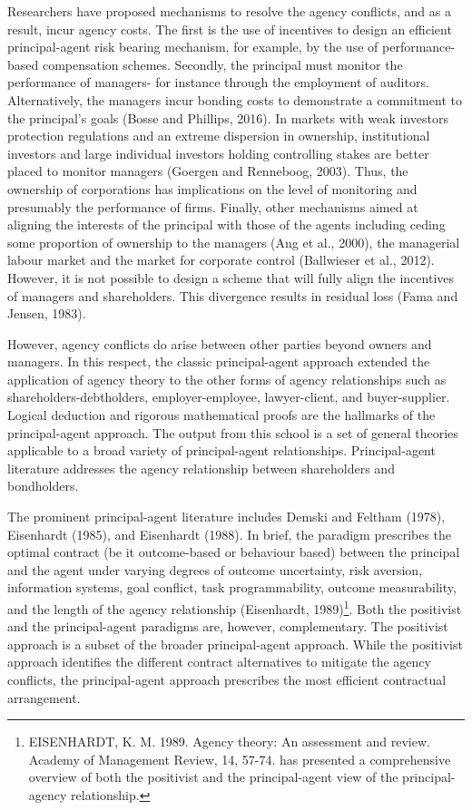 \documentclass[a4paper, nobind]{templates/ociamthesis}
\begin{document}
Researchers have proposed mechanisms to resolve the agency conflicts, and as a result, incur agency costs. The first is the use of incentives to design an efficient principal-agent risk bearing mechanism, for example, by the use of performance-based compensation schemes. Secondly, the principal must monitor the performance of managers- for instance through the employment of auditors. Alternatively, the managers incur bonding costs to demonstrate a commitment to the principal's goals (Bosse and Phillips, 2016).
In markets with weak investors protection regulations and an extreme dispersion in ownership, institutional investors and large individual investors holding controlling stakes are better placed to monitor managers (Goergen and Renneboog, 2003). Thus, the ownership of corporations has implications on the level of monitoring and presumably the performance of firms. Finally, other mechanisms aimed at aligning the interests of the principal with those of the agents including ceding some proportion of ownership to the managers (Ang et al., 2000), the managerial labour market and the market for corporate control (Ballwieser et al., 2012). However, it is not possible to design a scheme that will fully align the incentives of managers and shareholders. This divergence results in residual loss (Fama and Jensen, 1983).

However, agency conflicts do arise between other parties beyond owners and managers. In this respect, the classic principal-agent approach extended the application of agency theory to the other forms of agency relationships such as shareholders-debtholders, employer-employee, lawyer-client, and buyer-supplier. Logical deduction and rigorous mathematical proofs are the hallmarks of the principal-agent approach. The output from this school is a set of general theories applicable to a broad variety of principal-agent relationships. Principal-agent literature addresses the agency relationship between shareholders and bondholders.

The prominent principal-agent literature includes Demski and Feltham (1978), Eisenhardt (1985), and Eisenhardt (1988). In brief, the paradigm prescribes the optimal contract (be it outcome-based or behaviour based) between the principal and the agent under varying degrees of outcome uncertainty, risk aversion, information systems, goal conflict, task programmability, outcome measurability, and the length of the agency relationship (Eisenhardt, 1989)\footnote{EISENHARDT, K. M. 1989. Agency theory: An assessment and review. Academy of Management Review, 14, 57-74. has presented a comprehensive overview of both the positivist and the principal-agent view of the principal-agency relationship.}. Both the positivist and the principal-agent paradigms are, however, complementary. The positivist approach is a subset of the broader principal-agent approach. While the positivist approach identifies the different contract alternatives to mitigate the agency conflicts, the principal-agent approach prescribes the most efficient contractual arrangement.
\end{document}
